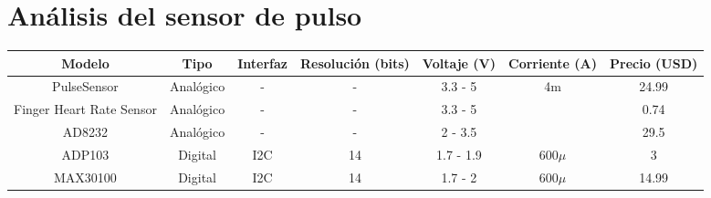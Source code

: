 
\section{Análisis del sensor de pulso}

\begin{center}
	\begin{sideways}
		\begin{tabulary}{10cm}{|c|c|c|c|c|c|c|}
			\hline
			Modelo&Tipo&Interfaz&Resolución (bits)&Voltaje (V)&Corriente (A)&Precio (USD)\\
			\hline
			\hline
			PulseSensor & Analógico&-&-& 3.3 - 5&4m&24.99 \\
			\hline
			Finger Heart Rate Sensor & Analógico& -&- & 3.3 - 5&&0.74 \\
			\hline
			AD8232 & Analógico& -& - & 2 - 3.5&&29.5 \\
			\hline
			ADP103 & Digital& I2C& 14 & 1.7 - 1.9&$600\mu$&3 \\
			\hline
			MAX30100 & Digital& I2C &14 & 1.7 - 2&$600\mu$&14.99 \\
			\hline
		\end{tabulary}
	\end{sideways}
\end{center}